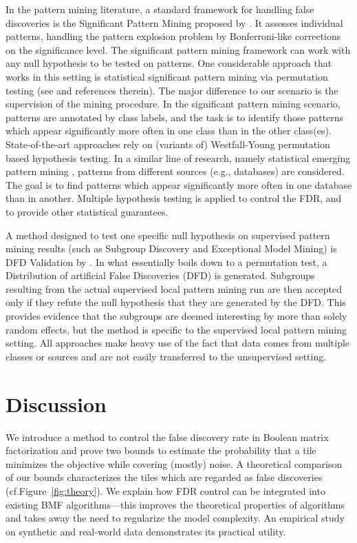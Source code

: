 In the pattern mining literature, a standard framework for handling false discoveries is the Significant Pattern Mining proposed by \cite{webb2007discovering}.  It assesses individual patterns, handling the pattern explosion problem by Bonferroni-like corrections on the significance level. The significant pattern mining framework can work with any null hypothesis to be tested on patterns.  
One considerable approach that works in this setting is statistical significant pattern mining via permutation testing (see \citep{llinares2015fast} and references therein). The major difference to our scenario is the supervision of the mining procedure. In the significant pattern mining scenario, patterns are annotated by class labels, and the task is to identify those patterns which appear significantly more often in one class than in the other class(es). State-of-the-art approaches rely on (variants of) Westfall-Young permutation based hypothesis testing. 
In a similar line of research, namely statistical emerging pattern mining \citep{komiyama2017statistical}, patterns from different sources (e.g., databases) are considered. The goal is to find patterns which appear significantly more often in one database than in another. Multiple hypothesis testing is applied to control the FDR, and to provide other statistical guarantees. 

A method designed to test one specific null hypothesis on supervised pattern mining results (such as Subgroup Discovery and Exceptional Model Mining) is DFD Validation by \cite{duivesteijn2011exploiting}.  In what essentially boils down to a permutation test, a Distribution of artificial False Discoveries (DFD) is generated.  Subgroups resulting from the actual supervised local pattern mining run are then accepted only if they refute the null hypothesis that they are generated by the DFD.  This provides evidence that the subgroups are deemed interesting by more than solely random effects, but the method is specific to the supervised local pattern mining setting.
All approaches make heavy use of the fact that data comes from multiple classes or sources and are not easily transferred to the unsupervised setting. 
\section{Discussion}\label{sec:TP:discussion}
We introduce  a method to control the false discovery rate in Boolean matrix factorization and prove two bounds to estimate the probability that a tile minimizes the objective while covering (mostly) noise.
A theoretical comparison of our bounds characterizes the tiles which are regarded as false discoveries (cf.\@ Figure~\ref{fig:theory}). 
We explain how FDR control can be integrated into existing BMF algorithms---this improves the theoretical properties of algorithms and takes away the need to regularize the model complexity. An empirical study on synthetic and real-world data demonstrates its practical utility.

